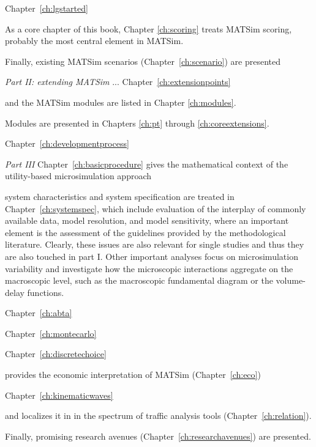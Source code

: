 Chapter~\ref{ch:lgstarted}

As a core chapter of this book, Chapter \ref{ch:scoring} treats MATSim scoring, probably the most central element in MATSim. 

Finally, existing MATSim scenarios (Chapter~\ref{ch:scenario}) are presented 

\emph{Part II: extending MATSim} ...
Chapter~\ref{ch:extensionpoints}

and the MATSim modules are listed in Chapter \ref{ch:modules}.

Modules are presented in Chapters \ref{ch:pt} through \ref{ch:coreextensions}.

Chapter~\ref{ch:developmentprocess} 

\emph{Part III}
Chapter~\ref{ch:basicprocedure} gives the mathematical context of the utility-based microsimulation approach

system characteristics and system specification are treated in Chapter~\ref{ch:systemspec}, which include evaluation of the interplay of commonly available data, model resolution, and model sensitivity, where an important element is the assessment of the guidelines provided by the methodological literature. Clearly, these issues are also relevant for single studies and thus they are also touched in part I. Other important analyses focus on microsimulation variability and investigate how the microscopic interactions aggregate on the macroscopic level, such as the macroscopic fundamental diagram or the volume-delay functions.

Chapter~\ref{ch:abta}

Chapter~\ref{ch:montecarlo}

Chapter~\ref{ch:discretechoice}


provides the economic interpretation of MATSim (Chapter~\ref{ch:eco}) 

Chapter~\ref{ch:kinematicwaves}

and localizes it in in the spectrum of traffic analysis tools (Chapter~\ref{ch:relation}). 



Finally, promising research avenues (Chapter~\ref{ch:researchavenues}) are presented.


